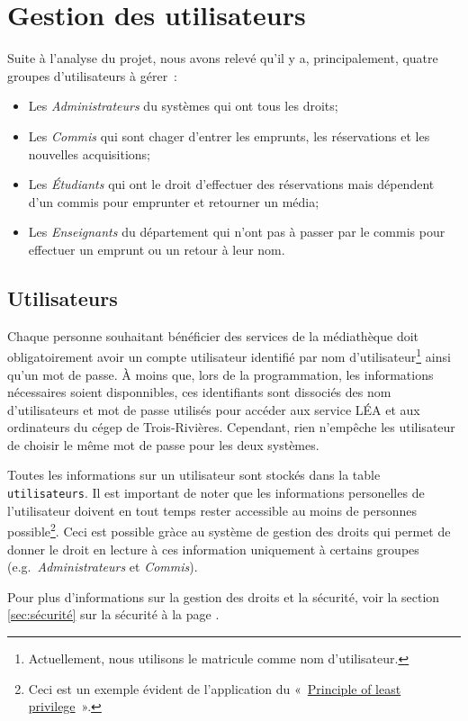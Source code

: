 \documentclass[letter, 11pt]{report}
\begin{document}
\section{Gestion des utilisateurs}

Suite à l'analyse du projet, nous avons relevé qu'il y a, principalement, quatre groupes d'utilisateurs à gérer~:
\begin{itemize}
	\item Les \emph{Administrateurs} du systèmes qui ont tous les droits;
	\item Les \emph{Commis} qui sont chager d'entrer les emprunts, les réservations et les nouvelles acquisitions;
	\item Les \emph{Étudiants} qui ont le droit d'effectuer des réservations mais dépendent d'un commis pour emprunter et retourner un média;
	\item Les \emph{Enseignants} du département qui n'ont pas à passer par le commis pour effectuer un emprunt ou un retour à leur nom.
\end{itemize}

\subsection{Utilisateurs}
Chaque personne souhaitant bénéficier des services de la médiathèque doit obligatoirement avoir un compte utilisateur identifié par nom d'utilisateur\footnote{Actuellement, nous utilisons le matricule comme nom d'utilisateur.} ainsi qu'un mot de passe. À moins que, lors de la programmation, les informations nécessaires soient disponnibles, ces identifiants sont dissociés des nom d'utilisateurs et mot de passe utilisés pour accéder aux service LÉA et aux ordinateurs du cégep de Trois-Rivières. Cependant, rien n'empêche les utilisateur de choisir le même mot de passe pour les deux systèmes.

Toutes les informations sur un utilisateur sont stockés dans la table \texttt{utilisateurs}. Il est important de noter que les informations personelles de l'utilisateur doivent en tout temps rester accessible au moins de personnes possible\footnote{Ceci est un exemple évident de l'application du «~\href{http://en.wikipedia.org/wiki/Principle_of_least_privilege}{Principle of least privilege}~».}. Ceci est possible gràce au système de gestion des droits qui permet de donner le droit en lecture à ces information uniquement à certains groupes (e.g.\ \emph{Administrateurs} et \emph{Commis}).

Pour plus d'informations sur la gestion des droits et la sécurité, voir la section \ref{sec:sécurité} sur la sécurité à la page \pageref{sec:sécurité}.
\end{document}
